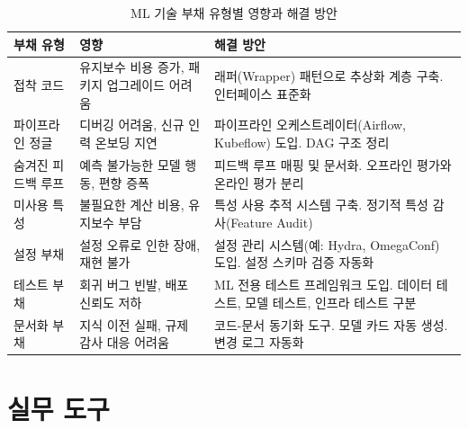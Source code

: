 \begin{table}[htbp]
\centering
\caption{ML 기술 부채 유형별 영향과 해결 방안}
\label{tab:tech_debt}
\begin{tabularx}{\textwidth}{p{2.5cm}p{3cm}X}
\toprule
\textbf{부채 유형} & \textbf{영향} & \textbf{해결 방안} \\
\midrule
접착 코드 & 유지보수 비용 증가, 패키지 업그레이드 어려움 & 래퍼(Wrapper) 패턴으로 추상화 계층 구축. 인터페이스 표준화 \\
\midrule
파이프라인 정글 & 디버깅 어려움, 신규 인력 온보딩 지연 & 파이프라인 오케스트레이터(Airflow, Kubeflow) 도입. DAG 구조 정리 \\
\midrule
숨겨진 피드백 루프 & 예측 불가능한 모델 행동, 편향 증폭 & 피드백 루프 매핑 및 문서화. 오프라인 평가와 온라인 평가 분리 \\
\midrule
미사용 특성 & 불필요한 계산 비용, 유지보수 부담 & 특성 사용 추적 시스템 구축. 정기적 특성 감사(Feature Audit) \\
\midrule
설정 부채 & 설정 오류로 인한 장애, 재현 불가 & 설정 관리 시스템(예: Hydra, OmegaConf) 도입. 설정 스키마 검증 자동화 \\
\midrule
테스트 부채 & 회귀 버그 빈발, 배포 신뢰도 저하 & ML 전용 테스트 프레임워크 도입. 데이터 테스트, 모델 테스트, 인프라 테스트 구분 \\
\midrule
문서화 부채 & 지식 이전 실패, 규제 감사 대응 어려움 & 코드-문서 동기화 도구. 모델 카드 자동 생성. 변경 로그 자동화 \\
\bottomrule
\end{tabularx}
\end{table}

\section{실무 도구}
\label{sec:10.8}

